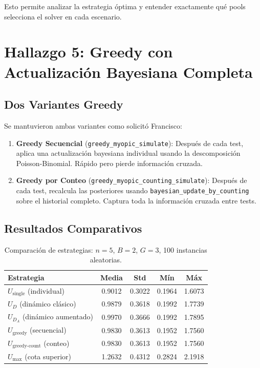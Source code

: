 \documentclass[11pt, a4paper]{article}
\begin{document}
Esto permite analizar la estrategia \'optima y entender exactamente
qu\'e pools selecciona el solver en cada escenario.

\section{Hallazgo 5: Greedy con Actualizaci\'on Bayesiana Completa}

\subsection{Dos Variantes Greedy}

Se mantuvieron ambas variantes como solicit\'o Francisco:

\begin{enumerate}[nosep]
    \item \textbf{Greedy Secuencial} (\texttt{greedy\_myopic\_simulate}):
    Despu\'es de cada test, aplica una actualizaci\'on bayesiana individual
    usando la descomposici\'on Poisson-Binomial. R\'apido pero pierde
    informaci\'on cruzada.

    \item \textbf{Greedy por Conteo}
    (\texttt{greedy\_myopic\_counting\_simulate}): Despu\'es de cada test,
    recalcula las posteriores usando \texttt{bayesian\_update\_by\_counting}
    sobre el historial completo. Captura toda la informaci\'on cruzada entre
    tests.
\end{enumerate}

\subsection{Resultados Comparativos}

\begin{table}[htbp]
\centering
\caption{Comparaci\'on de estrategias: $n=5$, $B=2$, $G=3$, 100 instancias aleatorias.}
\label{tab:comparison}
\begin{tabular}{lcccc}
\toprule
\textbf{Estrategia} & \textbf{Media} & \textbf{Std} & \textbf{M\'in} & \textbf{M\'ax} \\
\midrule
$U_{\text{single}}$ (individual) & 0.9012 & 0.3022 & 0.1964 & 1.6073 \\
$U_D$ (din\'amico cl\'asico) & 0.9879 & 0.3618 & 0.1992 & 1.7739 \\
$U_{D_A}$ (din\'amico aumentado) & 0.9970 & 0.3666 & 0.1992 & 1.7895 \\
$U_{\text{greedy}}$ (secuencial) & 0.9830 & 0.3613 & 0.1952 & 1.7560 \\
$U_{\text{greedy-count}}$ (conteo) & 0.9830 & 0.3613 & 0.1952 & 1.7560 \\
$U_{\max}$ (cota superior) & 1.2632 & 0.4312 & 0.2824 & 2.1918 \\
\bottomrule
\end{tabular}
\end{table}
\end{document}
